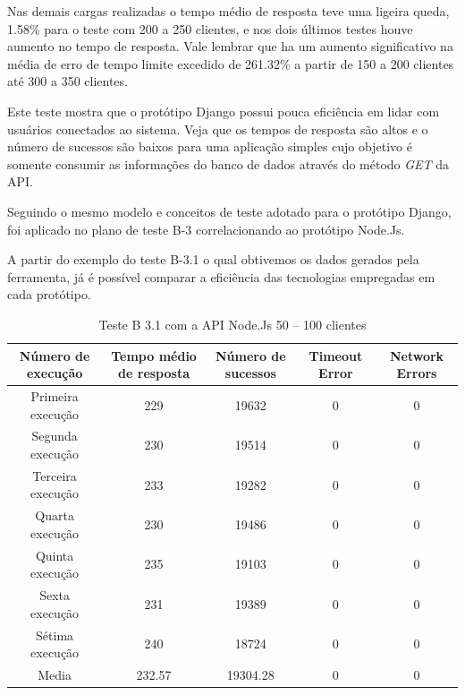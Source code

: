   Nas demais cargas realizadas o tempo médio de resposta teve uma ligeira queda, 1.58\% para o teste com 200 a 250 clientes, e nos dois
  últimos testes houve aumento no tempo de resposta. Vale lembrar que ha um aumento significativo na média de erro de tempo limite
  excedido de 261.32\% a partir de 150 a 200 clientes até 300 a 350 clientes.
  
  Este teste mostra que o protótipo Django possui pouca eficiência em lidar com usuários conectados ao sistema. Veja que os tempos de 
  resposta são altos e o número de sucessos são baixos para uma aplicação simples cujo objetivo é somente consumir as informações do banco de 
  dados através do método \textit{GET} da API.
  
  Seguindo o mesmo modelo e conceitos de teste adotado para o protótipo Django, foi aplicado no plano de teste 
  B-3 correlacionando ao protótipo Node.Js. 
  
  A partir do exemplo do teste B-3.1 o qual obtivemos os dados gerados pela ferramenta, já é possível comparar a eficiência das 
  tecnologias empregadas em cada protótipo.
  
  \begin{table}[H]
    \centering
    \footnotesize
    \setlength{\abovecaptionskip}{0pt}
    \setlength{\belowcaptionskip}{0pt}
    \caption[Teste B-3.1 com a API Node.Js 50 – 100 clientes]{Teste B 3.1 com a API Node.Js 50 – 100 clientes}
    \label{tab:teste-b-3-1}
    \begin{tabular}{c|c|c|c|c}
      \hline \hline
      Número de execução &	Tempo médio de resposta &	Número de sucessos &	Timeout Error &		 Network Errors \\
      \hline \hline
      Primeira execução &	229 &				19632 &			0 &				0 \\
      Segunda execução &	230 &				19514 &			0 &				0 \\
      Terceira execução &	233 &				19282 &			0 &				0 \\
      Quarta execução  &	230 &				19486 &			0 &				0 \\
      Quinta execução  &	235 &				19103 &			0 &				0 \\
      Sexta execução   &	231 &				19389 &			0 &				0 \\
      Sétima execução  &	240 &				18724 &			0 &				0 \\
      Media & 			232.57 &			19304.28 & 		0 &				0 \\
      \hline \hline
    \end{tabular}
  \end{table}
  
